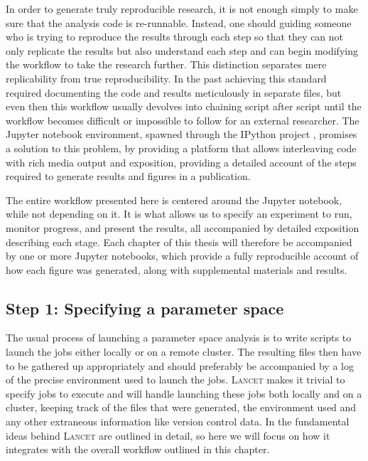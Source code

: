 In order to generate truly reproducible research, it is not enough
simply to make sure that the analysis code is re-runnable. Instead,
one should guiding someone who is trying to reproduce the results
through each step so that they can not only replicate the results but
also understand each step and can begin modifying the workflow to take
the research further. This distinction separates mere replicability
from true reproducibility. In the past achieving this standard
required documenting the code and results meticulously in separate
files, but even then this workflow usually devolves into chaining
script after script until the workflow becomes difficult or impossible
to follow for an external researcher. The Jupyter notebook
environment, spawned through the IPython project \citep{Perez2007},
promises a solution to this problem, by providing a platform that
allows interleaving code with rich media output and exposition,
providing a detailed account of the steps required to generate results
and figures in a publication.

The entire workflow presented here is centered around the Jupyter
notebook, while not depending on it. It is what allows us to specify
an experiment to run, monitor progress, and present the results, all
accompanied by detailed exposition describing each stage. Each chapter
of this thesis will therefore be accompanied by one or more Jupyter
notebooks, which provide a fully reproducible account of how each
figure was generated, along with supplemental materials and results.

\subsection{Step 1: Specifying a parameter space}

The usual process of launching a parameter space analysis is to write
scripts to launch the jobs either locally or on a remote cluster. The
resulting files then have to be gathered up appropriately and should
preferably be accompanied by a log of the precise environment used to
launch the jobs. \textsc{Lancet} makes it trivial to specify jobs to
execute and will handle launching these jobs both locally and on a
cluster, keeping track of the files that were generated, the
environment used and any other extraneous information like version
control data. In \cite{Stevens2013a} the fundamental ideas behind
\textsc{Lancet} are outlined in detail, so here we will focus on how
it integrates with the overall workflow outlined in this chapter.

